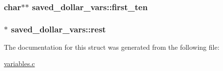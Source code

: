 \subsubsection[{\texorpdfstring{first\+\_\+ten}{first_ten}}]{\setlength{\rightskip}{0pt plus 5cm}char$\ast$$\ast$ saved\+\_\+dollar\+\_\+vars\+::first\+\_\+ten}\hypertarget{structsaved__dollar__vars_a34da2a52790b0c2d0c5f205188935406}{}\label{structsaved__dollar__vars_a34da2a52790b0c2d0c5f205188935406}
\subsubsection[{\texorpdfstring{rest}{rest}}]{$\ast$ saved\+\_\+dollar\+\_\+vars\+::rest}\hypertarget{structsaved__dollar__vars_a92f46b81a83fba6817445d87ef1f1ba7}{}\label{structsaved__dollar__vars_a92f46b81a83fba6817445d87ef1f1ba7}


The documentation for this struct was generated from the following file\+:\begin{DoxyCompactItemize}
\item 
\hyperlink{variables_8c}{variables.\+c}\end{DoxyCompactItemize}
